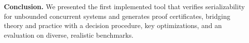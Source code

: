 %

%
%
%



\smallskip
\noindent
\textbf{Conclusion.}
We presented the first implemented tool that verifies serializability for unbounded concurrent systems and generates proof certificates, bridging theory and practice with a decision procedure, key optimizations, and an evaluation on diverse, realistic benchmarks.
